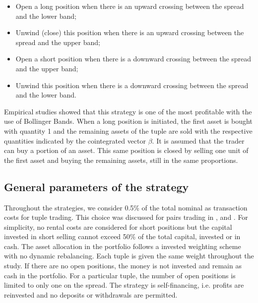 \documentclass[11pt,a4,twosided,singlespacing,titlepagenumber=on]{scrreprt}
\numberwithin{equation}{chapter} %
\theoremstyle{remark}
\begin{document}
\begin{itemize}
\item Open a long position when there is an upward crossing between the spread and the lower band;
\item Unwind (close) this position when there is an upward crossing between the spread and the upper band;
\item Open a short position when there is a downward crossing between the spread and the upper band;
\item Unwind this position when there is a downward crossing between the spread and the lower band.
\end{itemize}
Empirical studies showed that this strategy is one of the most profitable with the use of Bollinger Bands. When a long position is initiated, the first asset is bought with quantity 1 and the remaining assets of the tuple are sold with the respective quantities indicated by the cointegrated vector $\beta$. It is assumed that the trader can buy a portion of an asset. This same position is closed by selling one unit of the first asset and buying the remaining assets, still in the same proportions.

\subsection{General parameters of the strategy}
Throughout the strategies, we consider 0.5\% of the total nominal as transaction costs for tuple trading. This choice was discussed for pairs trading in \cite{dunis2010}, \cite{dunis2005} and \cite{alexander2002}. For simplicity, no rental costs are considered for short positions but the capital invested in short selling cannot exceed 50\% of the total capital, invested or in cash. The asset allocation in the portfolio follows a invested weighting scheme with no dynamic rebalancing. Each tuple is given the same weight throughout the study. If there are no open positions, the money is not invested and remain as cash in the portfolio. For a particular tuple, the number of open positions is limited to only one on the spread. The strategy is self-financing, i.e. profits are reinvested and no deposits or withdrawals are permitted.
\end{document}
